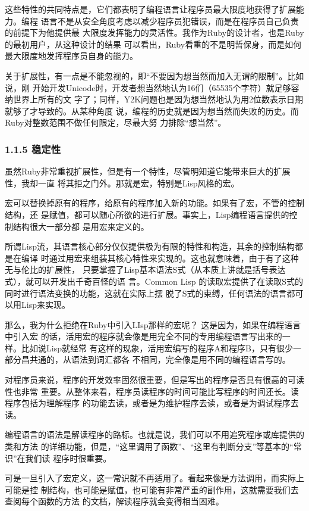 \documentclass[11pt]{ctexart}
\begin{document}
这些特性的共同特点是，它们都表明了编程语言让程序员最大限度地获得了扩展能力。编程
语言不是从安全角度考虑以减少程序员犯错误，而是在程序员自己负责的前提下为他提供最
大限度发挥能力的灵活性。我作为Ruby的设计者，也是Ruby的最初用户，从这种设计的结果
可以看出，Ruby看重的不是明哲保身，而是如何最大限度地发挥程序员自身的能力。

关于扩展性，有一点是不能忽视的，即“不要因为想当然而加入无谓的限制”。比如说，刚
开始开发Unicode时，开发者想当然地认为16们（65535个字符）就足够容纳世界上所有的文
字了；同样，Y2K问题也是因为想当然地认为用2位数表示日期就够了才导致的。从某种角度
说，编程的历史就是因为想当然而失败的历史。而Ruby对整数范围不做任何限定，尽最大努
力排除“想当然”。

\subsubsection{1.1.5 稳定性}
\label{sec:orgheadline5}

虽然Ruby非常重视扩展性，但是有一个特性，尽管明知道它能带来巨大的扩展性，我却一直
将其拒之门外。那就是宏，特别是Lisp风格的宏。

宏可以替换掉原有的程序，给原有的程序加入新的功能。如果有了宏，不管的控制结构，还
是赋值，都可以随心所欲的进行扩展。事实上，Lisp编程语言提供的控制结构很大一部分都
是用宏来定义的。

所谓Lisp流，其语言核心部分仅仅提供极为有限的特性和构造，其余的控制结构都是在编译
时通过用宏来组装其核心特性来实现的。这也就意味着，由于有了这种无与伦比的扩展性，
只要掌握了Lisp基本语法S式（从本质上讲就是括号表达式），就可以开发出千奇百怪的语
言。Common Lisp 的读取宏提供了在读取S式的同时进行语法变换的功能，这就在实际上摆
脱了S式的束缚，任何语法的语言都可以用Lisp来实现。

那么，我为什么拒绝在Ruby中引入LIsp那样的宏呢？ 这是因为，如果在编程语言中引入宏
的话，活用宏的程序就会像是用完全不同的专用编程语言写出来的一样。比如说Lisp就经常
有这样的现象，活用宏编写的程序A和程序B，只有很少一部分昌共通的，从语法到词汇都各
不相同，完全像是用不同的编程语言写的。

对程序员来说，程序的开发效率固然很重要，但是写出的程序是否具有很高的可读性也非常
重要。从整体来看，程序员读程序的时间可能比写程序的时间还长。读程序包括为理解程序
的功能去读，或者是为维护程序去读，或者是为调试程序去读。

编程语言的语法是解读程序的路标。也就是说，我们可以不用追究程序或库提供的类和方法
的详细功能，但是，“这里调用了函数”、“这里有判断分支”等基本的“常识”在我们读
程序时很重要。

可是一旦引入了宏定义，这一常识就不再适用了。看起来像是方法调用，而实际上可能是控
制结构，也可能是赋值，也可能有非常严重的副作用，这就需要我们去查阅每个函数的方法
的文档，解读程序就会变得相当困难。
\end{document}
